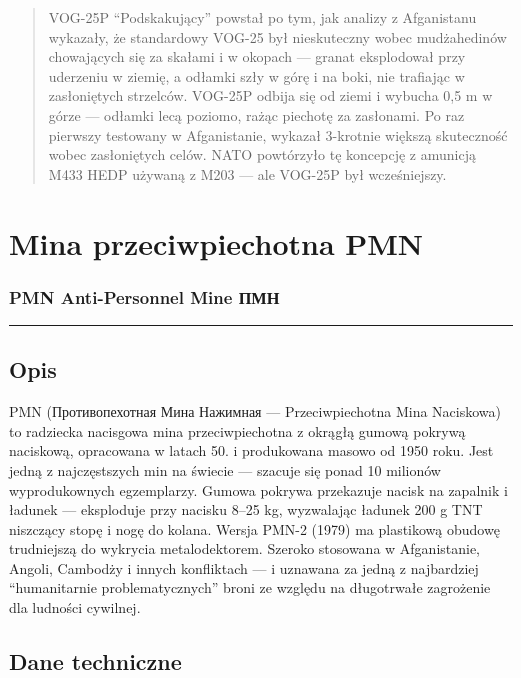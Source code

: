 \documentclass[12pt,openany,oneside]{book}
\begin{document}
\begin{quote}
VOG-25P ``Podskakujący'' powstał po tym, jak analizy z Afganistanu
wykazały, że standardowy VOG-25 był nieskuteczny wobec mudżahedinów
chowających się za skałami i w okopach --- granat eksplodował przy
uderzeniu w ziemię, a odłamki szły w górę i na boki, nie trafiając w
zasłoniętych strzelców. VOG-25P odbija się od ziemi i wybucha 0,5 m w
górze --- odłamki lecą poziomo, rażąc piechotę za zasłonami. Po raz
pierwszy testowany w Afganistanie, wykazał 3-krotnie większą skuteczność
wobec zasłoniętych celów. NATO powtórzyło tę koncepcję z amunicją M433
HEDP używaną z M203 --- ale VOG-25P był wcześniejszy.
\end{quote}

\chapter{Mina przeciwpiechotna PMN}\label{mina-przeciwpiechotna-pmn}

\subsection{PMN Anti-Personnel Mine \textbar{}
ПМН}\label{pmn-anti-personnel-mine-ux43fux43cux43d}

\begin{center}\rule{0.5\linewidth}{0.5pt}\end{center}

\section{Opis}\label{opis-107}

PMN (Противопехотная Мина Нажимная --- Przeciwpiechotna Mina Naciskowa)
to radziecka nacisgowa mina przeciwpiechotna z okrągłą gumową pokrywą
naciskową, opracowana w latach 50. i produkowana masowo od 1950 roku.
Jest jedną z najczęstszych min na świecie --- szacuje się ponad 10
milionów wyprodukownych egzemplarzy. Gumowa pokrywa przekazuje nacisk na
zapalnik i ładunek --- eksploduje przy nacisku 8--25 kg, wyzwalając
ładunek 200 g TNT niszczący stopę i nogę do kolana. Wersja PMN-2 (1979)
ma plastikową obudowę trudniejszą do wykrycia metalodektorem. Szeroko
stosowana w Afganistanie, Angoli, Cambodży i innych konfliktach --- i
uznawana za jedną z najbardziej ``humanitarnie problematycznych'' broni
ze względu na długotrwałe zagrożenie dla ludności cywilnej.

\section{Dane techniczne}\label{dane-techniczne-107}
\end{document}
